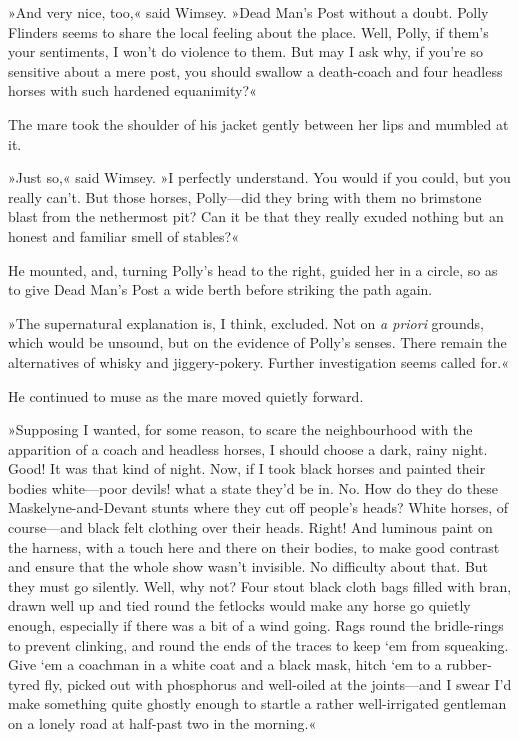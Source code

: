 »And very nice, too,« said Wimsey. »Dead Man's Post without a doubt. Polly Flinders seems to share the local feeling about the place. Well, Polly, if them's your sentiments, I won't do violence to them. But may I ask why, if you're so sensitive about a mere post, you should swallow a death-coach and four headless horses with such hardened equanimity?«

The mare took the shoulder of his jacket gently between her lips and mumbled at it.

»Just so,« said Wimsey. »I perfectly understand. You would if you could, but you really can't. But those horses, Polly—did they bring with them no brimstone blast from the nethermost pit? Can it be that they really exuded nothing but an honest and familiar smell of stables?«

He mounted, and, turning Polly's head to the right, guided her in a circle, so as to give Dead Man's Post a wide berth before striking the path again.

»The supernatural explanation is, I think, excluded. Not on \textit{a priori} grounds, which would be unsound, but on the evidence of Polly's senses. There remain the alternatives of whisky and jiggery-pokery. Further investigation seems called for.«

He continued to muse as the mare moved quietly forward.

»Supposing I wanted, for some reason, to scare the neighbourhood with the apparition of a coach and headless horses, I should choose a dark, rainy night. Good! It was that kind of night. Now, if I took black horses and painted their bodies white—poor devils! what a state they'd be in. No. How do they do these Maskelyne-and-Devant stunts where they cut off people's heads? White horses, of course—and black felt clothing over their heads. Right! And luminous paint on the harness, with a touch here and there on their bodies, to make good contrast and ensure that the whole show wasn't invisible. No difficulty about that. But they must go silently. Well, why not? Four stout black cloth bags filled with bran, drawn well up and tied round the fetlocks would make any horse go quietly enough, especially if there was a bit of a wind going. Rags round the bridle-rings to prevent clinking, and round the ends of the traces to keep `em from squeaking. Give `em a coachman in a white coat and a black mask, hitch `em to a rubber-tyred fly, picked out with phosphorus and well-oiled at the joints—and I swear I'd make something quite ghostly enough to startle a rather well-irrigated gentleman on a lonely road at half-past two in the morning.«

